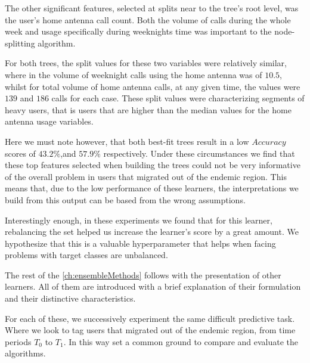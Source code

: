 The other significant features, selected at splits near to the tree's root level, was the user's home antenna call count.
Both the volume of calls during the whole week and usage specifically during weeknights time was important to the node-splitting algorithm.

For both trees, the split values for these two variables were relatively similar, where in the volume of weeknight calls using the home antenna was of $10.5$, whilst for total volume of home antenna calls, at any given time, the values were $139$ and $186$ calls for each case.
These split values were characterizing segments of heavy users, that is users that are higher than the median values for the home antenna usage variables.%



Here we must note however, that both best-fit trees result in a low $Accuracy$ scores of $43.2\%$,and $57.9\%$ respectively.
Under these circumstances we find that these top features selected when building the trees could not be very informative of the overall problem in users that migrated out of the endemic region.
This means that, due to the low performance of these learners, the interpretations we build from this output can be based from the wrong assumptions.



Interestingly enough, in these experiments we found that for this learner, rebalancing the set helped us increase the learner's score by a great amount.
We hypothesize that this is a valuable hyperparameter that helps when facing problems with target classes are unbalanced.



The rest of the \cref{ch:ensembleMethods} follows with the presentation of other learners.
All of them are introduced with a brief explanation of their formulation and their distinctive characteristics.

For each of these, we successively experiment the same difficult predictive task.
Where we look to tag users that migrated out of the endemic region, from time periods $T_0$ to $T_1$.
In this way   set a common ground to compare and evaluate the algorithms.

